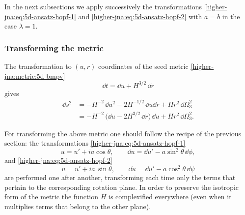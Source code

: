 In the next subsections we apply successively the transformations \eqref{higher-jna:eq:5d-ansatz-hopf-1} and \eqref{higher-jna:eq:5d-ansatz-hopf-2} with $a = b$ in the case $\lambda = 1$.


\subsubsection{Transforming the metric}


The transformation to $(u, r)$ coordinates of the seed metric \eqref{higher-jna:metric:5d-bmpv}
\begin{equation}
	\dd t = \dd u + H^{3/2}\, \dd r
\end{equation} 
gives
\begin{subequations}
\begin{align}
	\dd s^2 &= - H^{-2}\, \dd u^2 - 2 H^{-1/2}\, \dd u \dd r + H r^2\, \dd\Omega_3^2 \\
		&= - H^{-2}\, \big(\dd u - 2 H^{3/2}\, \dd r \big)\, \dd u + H r^2\, \dd\Omega_3^2.
\end{align}
\end{subequations}

For transforming the above metric one should follow the recipe of the previous section: the transformations \eqref{higher-jna:eq:5d-ansatz-hopf-1}
\begin{equation}
	u = u' + i a \cos \theta, \qquad
	\dd u = \dd u' - a \sin^2 \theta\, \dd\phi,
\end{equation}
and \eqref{higher-jna:eq:5d-ansatz-hopf-2}
\begin{equation}
	u = u' + i a\, \sin \theta, \qquad
	\dd u = \dd u' - a \cos^2 \theta\, \dd\psi
\end{equation} 
are performed one after another, transforming each time only the terms that pertain to the corresponding rotation plane.\footnotemark{}%
In order to preserve the isotropic form of the metric the function $H$ is complexified everywhere (even when it multiplies terms that belong to the other plane).

